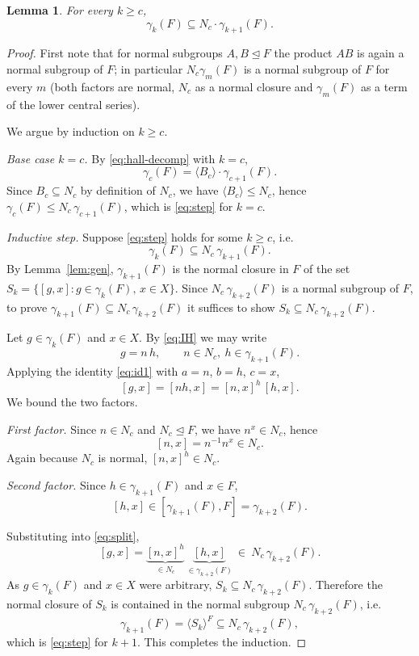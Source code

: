 \documentclass{amsart}
\newtheorem{lemma}{Lemma}
\theoremstyle{definition}
\theoremstyle{remark}
\begin{document}
\begin{lemma}\label{lem:Nc-step}
For every $k\ge c$,
\begin{equation}\label{eq:step}
\gamma_k(F)\subseteq N_c\cdot\gamma_{k+1}(F).
\end{equation}
\end{lemma}

\begin{proof}
First note that for normal subgroups $A,B\trianglelefteq F$ the product $AB$ is again
a normal subgroup of $F$; in particular $N_c\gamma_{m}(F)$ is a normal subgroup of
$F$ for every $m$ (both factors are normal, $N_c$ as a normal closure and
$\gamma_m(F)$ as a term of the lower central series).

We argue by induction on $k\ge c$.

\emph{Base case $k=c$.} By \eqref{eq:hall-decomp} with $k=c$,
\[
\gamma_c(F)=\langle B_c\rangle\cdot\gamma_{c+1}(F).
\]
Since $B_c\subseteq N_c$ by definition of $N_c$, we have
$\langle B_c\rangle\le N_c$, hence
$\gamma_c(F)\le N_c\,\gamma_{c+1}(F)$, which is \eqref{eq:step} for $k=c$.

\emph{Inductive step.} Suppose \eqref{eq:step} holds for some $k\ge c$, i.e.
\begin{equation}\label{eq:IH}
\gamma_k(F)\subseteq N_c\,\gamma_{k+1}(F).
\end{equation}
By Lemma~\ref{lem:gen}, $\gamma_{k+1}(F)$ is the normal closure in $F$ of the set
$S_k=\{[g,x]:g\in\gamma_k(F),\,x\in X\}$. Since $N_c\,\gamma_{k+2}(F)$ is a normal
subgroup of $F$, to prove $\gamma_{k+1}(F)\subseteq N_c\,\gamma_{k+2}(F)$ it
suffices to show $S_k\subseteq N_c\,\gamma_{k+2}(F)$.

Let $g\in\gamma_k(F)$ and $x\in X$. By \eqref{eq:IH} we may write
\[
g=n\,h,\qquad n\in N_c,\ h\in\gamma_{k+1}(F).
\]
Applying the identity \eqref{eq:id1} with $a=n$, $b=h$, $c=x$,
\begin{equation}\label{eq:split}
[g,x]=[nh,x]=[n,x]^{h}\,[h,x].
\end{equation}
We bound the two factors.

\emph{First factor.} Since $n\in N_c$ and $N_c\trianglelefteq F$, we have
$n^{x}\in N_c$, hence
\[
[n,x]=n^{-1}n^{x}\in N_c .
\]
Again because $N_c$ is normal, $[n,x]^{h}\in N_c$.

\emph{Second factor.} Since $h\in\gamma_{k+1}(F)$ and $x\in F$,
\[
[h,x]\in[\gamma_{k+1}(F),F]=\gamma_{k+2}(F).
\]

Substituting into \eqref{eq:split},
\[
[g,x]=\underbrace{[n,x]^{h}}_{\in N_c}\,\underbrace{[h,x]}_{\in\gamma_{k+2}(F)}
\ \in\ N_c\,\gamma_{k+2}(F).
\]
As $g\in\gamma_k(F)$ and $x\in X$ were arbitrary, $S_k\subseteq N_c\,\gamma_{k+2}(F)$.
Therefore the normal closure of $S_k$ is contained in the normal subgroup
$N_c\,\gamma_{k+2}(F)$, i.e.
\[
\gamma_{k+1}(F)=\langle S_k\rangle^{F}\subseteq N_c\,\gamma_{k+2}(F),
\]
which is \eqref{eq:step} for $k+1$. This completes the induction.
\end{proof}
\end{document}
